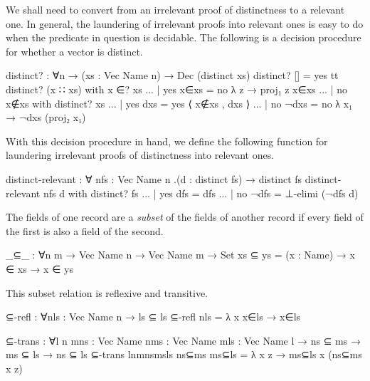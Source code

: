 We shall need to convert from an irrelevant proof of distinctness to a
relevant one. In general, the laundering of irrelevant proofs into
relevant ones is easy to do when the predicate in question is decidable.
The following is a decision procedure for whether a vector is distinct.

\begin{fence}
\begin{code}
distinct? : ∀{n} → (xs : Vec Name n) → Dec (distinct xs)
distinct? [] = yes tt
distinct? (x ∷ xs)
    with x ∈? xs
... | yes x∈xs = no λ z → proj₁ z x∈xs
... | no x∉xs
    with distinct? xs
... | yes dxs = yes ⟨ x∉xs , dxs ⟩
... | no ¬dxs = no λ x₁ → ¬dxs (proj₂ x₁)
\end{code}
\end{fence}

With this decision procedure in hand, we define the following function
for laundering irrelevant proofs of distinctness into relevant ones.

\begin{fence}
\begin{code}
distinct-relevant : ∀ {n}{fs : Vec Name n} .(d : distinct fs) → distinct fs
distinct-relevant {n}{fs} d
    with distinct? fs
... | yes dfs = dfs
... | no ¬dfs = ⊥-elimi (¬dfs d)
\end{code}
\end{fence}

The fields of one record are a \emph{subset} of the fields of another
record if every field of the first is also a field of the second.

\begin{fence}
\begin{code}
_⊆_ : ∀{n m} → Vec Name n → Vec Name m → Set
xs ⊆ ys = (x : Name) → x ∈ xs → x ∈ ys
\end{code}
\end{fence}

This subset relation is reflexive and transitive.

\begin{fence}
\begin{code}
⊆-refl : ∀{n}{ls : Vec Name n} → ls ⊆ ls
⊆-refl {n}{ls} = λ x x∈ls → x∈ls

⊆-trans : ∀{l n m}{ns  : Vec Name n}{ms  : Vec Name m}{ls  : Vec Name l}
   → ns ⊆ ms  →  ms ⊆ ls  →  ns ⊆ ls
⊆-trans {l}{n}{m}{ns}{ms}{ls} ns⊆ms ms⊆ls = λ x z → ms⊆ls x (ns⊆ms x z)
\end{code}
\end{fence}

